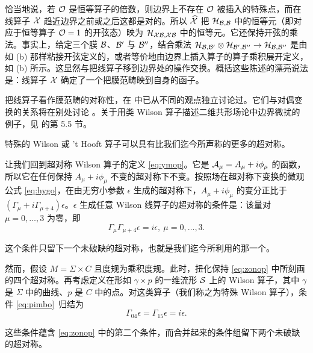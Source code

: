恰当地说，若 ${\EUO}$ 是恒等算子的倍数，则边界上不存在 ${\EUO}$ 被插入的特殊点，而在线算子 $\EUX$ 趋近边界之前或之后这都是对的。所以 $\hat\EUX$ 把 ${\cal H}_{{\cal B},{\cal B}}$ 中的恒等元（即对应于恒等算子 ${\EUO}=1$ 的开弦态）映为 ${\cal H}_{\EUX{\cal B},\EUX{\cal B}}$ 中的恒等元。它还保持开弦的乘法。事实上，给定三个膜 ${\cal B}$、${\cal B}'$ 与 ${\cal B}''$，结合乘法 ${\cal H}_{{\cal B},{\cal B}'}\otimes{\cal
H}_{{\cal B}',{\cal B}''}\to {\cal H}_{{\cal B},{\cal B}''}$ 是由如 \dunamp(b) 那样粘接开弦定义的，或者等价地由边界上插入算子的算子乘积展开定义，如 \zingop(b) 所示。这显然与把线算子移到边界处的操作交换。概括这些陈述的漂亮说法是：线算子 $\EUX$ 确定了一个把膜范畴映到自身的函子。

把线算子看作膜范畴的对称性，在 \cite{ref99} 中已从不同的观点独立讨论过。它们与对偶变换的关系将在别处讨论 \cite{ref26}。关于用类 Wilson 算子描述二维共形场论中边界微扰的例子，见 \cite{ref100} 的第 5.5 节。

\par{}

特殊的 Wilson 或 't Hooft 算子可以具有比我们迄今所声称的更多的超对称。

让我们回到超对称 Wilson 算子的定义 \eqref{eq:ymop}。它是 ${\cal
A}_\mu=A_\mu+i\phi_\mu$ 的函数，所以它在任何保持 $A_\mu+i\phi_\mu$ 不变的超对称下不变。按照场在超对称下变换的微观公式 \eqref{eq:hygo}，在由无穷小参数 $\epsilon$ 生成的超对称下，$A_\mu+i\phi_\mu$ 的变分正比于 $(\Gamma_\mu+i\Gamma_{\mu+4})\epsilon$。$\epsilon$ 生成任意 Wilson 线算子的超对称的条件是：该量对 $\mu=0,\dots,3$ 为零，即
\setcounter{equation}{29}
\begin{equation}\label{eq:pimbo}
\Gamma_{\mu}\Gamma_{\mu+4}\epsilon=i\epsilon,~\mu=0,\dots,3.
\end{equation}

这个条件只留下一个未破缺的超对称，也就是我们迄今所利用的那一个。

然而，假设 $M=\Sigma\times C$ 且度规为乘积度规。此时，扭化保持 \eqref{eq:zonop} 中所刻画的四个超对称。再考虑定义在形如 $\gamma\times
p$ 的一维流形 ${{\cal S}}$ 上的 Wilson 算子，其中 $\gamma$ 是 $\Sigma$ 中的曲线、$p$ 是 $C$ 中的点。对这类算子（我们称之为特殊 Wilson 算子），条件 \eqref{eq:pimbo}\ 归结为
\setcounter{equation}{30}
\begin{equation}\label{eq:relfo}
\Gamma_{04}\epsilon=\Gamma_{15}\epsilon=i\epsilon.
\end{equation}

这些条件蕴含 \eqref{eq:zonop} 中的第二个条件，而合并起来的条件组留下两个未破缺的超对称。

